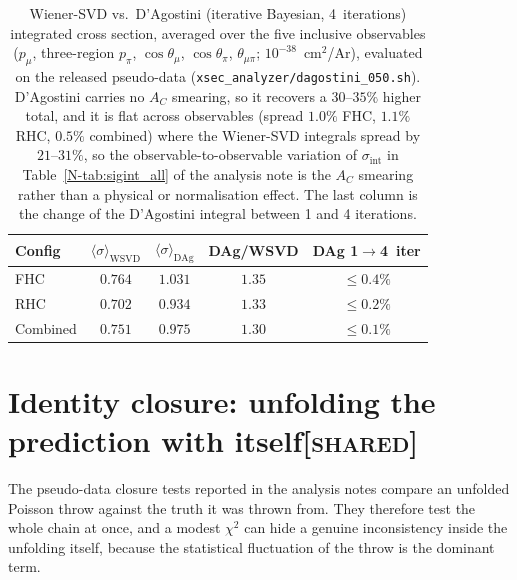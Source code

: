 \documentclass[11pt,a4paper]{article}
\newcommand{\noteref}[2]{#1~\ref{N-#2} of the analysis note}
\newcommand{\scopetag}[1]{\hfill{\normalfont\small\textsc{[#1]}}}
\begin{document}
\begin{table}[H]
  \centering
  \caption{Wiener-SVD vs.\ D'Agostini (iterative Bayesian, 4~iterations) integrated
    cross section, averaged over the five inclusive observables ($p_\mu$, three-region $p_\pi$,
    $\cos\theta_\mu$, $\cos\theta_\pi$, $\theta_{\mu\pi}$; $10^{-38}$~cm$^2$/Ar), evaluated on the
    released pseudo-data (\texttt{xsec\_analyzer/dagostini\_050.sh}). D'Agostini carries no $A_C$ smearing, so
    it recovers a $30$--$35\%$ higher total, and it is flat across observables (spread $1.0\%$ FHC,
    $1.1\%$ RHC, $0.5\%$ combined) where the Wiener-SVD integrals spread by $21$--$31\%$,
    so the observable-to-observable variation of $\sigma_\mathrm{int}$ in
    \noteref{Table}{tab:sigint_all} is the $A_C$ smearing rather than a physical or
    normalisation effect. The last column is the change of the D'Agostini integral between
    1 and 4 iterations.}
  \label{tab:dagostini}
  \begin{tabular}{lcccc}
    \toprule
    Config & $\langle\sigma\rangle_\mathrm{WSVD}$ & $\langle\sigma\rangle_\mathrm{DAg}$
      & DAg/WSVD & DAg 1$\to$4~iter \\
    \midrule
    FHC      & $0.764$ & $1.031$ & $1.35$ & $\le0.4\%$ \\
    RHC      & $0.702$ & $0.934$ & $1.33$ & $\le0.2\%$ \\
    Combined & $0.751$ & $0.975$ & $1.30$ & $\le0.1\%$ \\
    \bottomrule
  \end{tabular}
\end{table}


\section[Identity closure: unfolding the prediction with itself]{Identity closure: unfolding the prediction with itself\scopetag{shared}}
\label{sec:identity}

The pseudo-data closure tests reported in the analysis notes compare an unfolded Poisson throw against
the truth it was thrown from. They therefore test the whole chain at once, and a modest
$\chi^2$ can hide a genuine inconsistency inside the unfolding itself, because the
statistical fluctuation of the throw is the dominant term.
\end{document}

